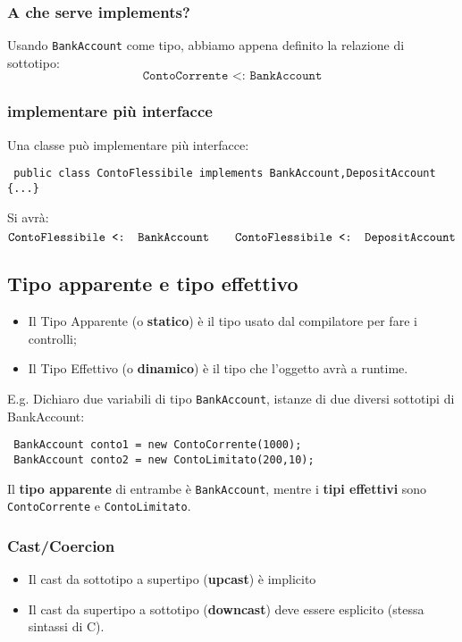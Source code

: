 \documentclass[a4paper,10pt]{article}
\begin{document}
\subsubsection{A che serve implements?}
Usando \texttt{BankAccount} come tipo, abbiamo appena definito la relazione di sottotipo:
\[\texttt{ContoCorrente <: BankAccount}\]
\subsubsection{implementare più interfacce}
Una classe può implementare più interfacce:
\begin{lstlisting}
 public class ContoFlessibile implements BankAccount,DepositAccount {...}
\end{lstlisting}
Si avrà: 
\[\texttt{ContoFlessibile <: BankAccount\quad\quad ContoFlessibile <: DepositAccount}\]

\subsection{Tipo apparente e tipo effettivo}

\begin{itemize}
 \item Il Tipo Apparente (o \textbf{statico}) è il tipo usato dal compilatore per fare i controlli;
 \item Il Tipo Effettivo (o \textbf{dinamico}) è il tipo che l'oggetto avrà a runtime.
\end{itemize}

E.g. Dichiaro due variabili di tipo \texttt{BankAccount}, istanze di due diversi sottotipi di BankAccount:

\begin{lstlisting}
 BankAccount conto1 = new ContoCorrente(1000);
 BankAccount conto2 = new ContoLimitato(200,10);
\end{lstlisting}

Il \textbf{tipo apparente} di entrambe è \texttt{BankAccount}, mentre i \textbf{tipi effettivi} sono \texttt{ContoCorrente} e \texttt{ContoLimitato}.

\subsubsection{Cast/Coercion}
\begin{itemize}
 \item Il cast da sottotipo a supertipo (\textbf{upcast}) è implicito
 \item Il cast da supertipo a sottotipo (\textbf{downcast}) deve essere esplicito (stessa sintassi di C).
\end{itemize}
\end{document}

